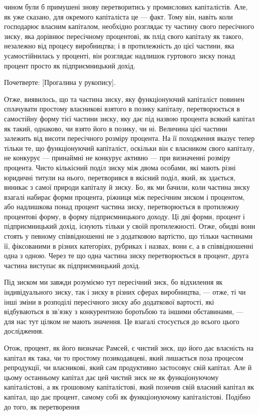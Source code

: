 \parcont{}  %
чином були б примушені знову перетворитись у промислових
капіталістів. Але, як уже сказано, для окремого капіталіста
це — факт. Тому він, навіть коли господарює власним капіталом,
необхідно розглядає ту частину свого пересічного зиску,
яка дорівнює пересічному процентові, як плід свого капіталу
як такого, незалежно від процесу виробництва; і в протилежність
до цієї частини, яка усамостійнилась у проценті, він розглядає
надлишок гуртового зиску понад процент просто як підприємницький
дохід.

Почетверте: [Прогалина у рукопису].

Отже, виявилось, що та частина зиску, яку функціонуючий
капіталіст повинен сплачувати простому власникові взятого в позику
капіталу, перетворюється в самостійну форму тієї частини
зиску, яку дає під назвою процента всякий капітал як
такий, однаково, чи взято його в позику, чи ні. Величина цієї
частини залежить від висоти пересічного розміру процента.
На її походження вказує тепер тільки те, що функціонуючий
капіталіст, оскільки він є власником свого капіталу, не конкурує
— принаймні не конкурує активно — при визначенні розміру
процента. Чисто кількісний поділ зиску між двома особами, які
мають різні юридичні титули на нього, перетворився в якісний
поділ, який, як здається, виникає з самої природи капіталу
й зиску. Бо, як ми бачили, коли частина зиску взагалі набирає
форми процента, ріжниця між пересічним зиском і процентом,
або надлишкова понад процент частина зиску, перетворюється
в протилежну процентові форму, в форму підприємницького
доходу. Ці дві форми, процент і підприємницький дохід, існують
тільки у своїй протилежності. Отже, обидві вони стоять у певному
співвідношенні не з додатковою вартістю, що тільки частинами
її, фіксованими в різних категоріях, рубриках і назвах,
вони є, а в співвідношенні одна з одною. Через те що одна
частина зиску перетворюється в процент, друга частина виступає
як підприємницький дохід.

Під зиском ми завжди розуміємо тут пересічний зиск, бо
відхилення як індивідуального зиску, так і зиску в різних сферах
виробництва, — отже, ті чи інші зміни в розподілі пересічного
зиску або додаткової вартості, які відбуваються в зв’язку
з конкурентною боротьбою та іншими обставинами, — для нас
тут цілком не мають значення. Це взагалі стосується до всього
цього дослідження.

Отож, процент, як його визначає Рамсей, є чистий зиск, що
його дає власність на капітал як така, чи то простому позикодавцеві,
який лишається поза процесом репродукції, чи власникові,
який сам продуктивно застосовує свій капітал. Але й цьому
останньому капітал дає цей чистий зиск не як функціонуючому
капіталістові, а як грошовому капіталістові, який позичив свій
власний капітал як капітал, що дає процент, самому собі як
функціонуючому капіталістові. Подібно до того, як перетворення
\parbreak{}  %
